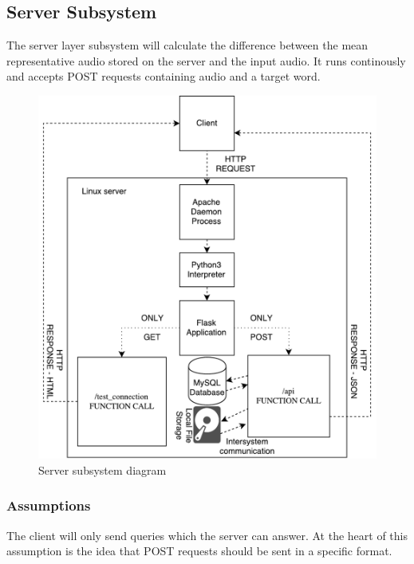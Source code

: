 \subsection{Server Subsystem}
The server layer subsystem will calculate the difference between the mean representative audio stored on the server and the input audio.
It runs continously and accepts POST requests containing audio and a target word.

\begin{figure}[h!]
	\centering
 	\includegraphics[width=\textwidth]{images/server_subsystems.pdf}
 \caption{Server subsystem diagram}
\end{figure}

\subsubsection{Assumptions}
    The client will only send queries which the server can answer. At the heart of this assumption is the idea that POST requests should be sent in a specific format.


